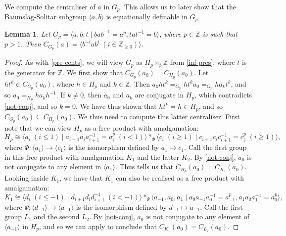 \documentclass[11pt]{amsart}
\newtheorem{lem}[theorem]{Lemma}
\theoremstyle{definition}
\numberwithin{theorem}{section}
\newcommand{\Z}{\mathbb{Z}}
\begin{document}
We compute the centraliser of \(a\) in \(G_p\). This allows us to later show that
	 the Baumslag-Solitar subgroup \(\langle a, b \rangle\) is equationally definable
	 in \(G_p\).
\begin{lem}
		\label{cents}
		Let \(G_p = \langle a, b, t \mid bab^{-1} = a^p, tat^{-1} = b\rangle\),
		where \(p \in \Z\) is such that \(p > 1\).  Then \(C_{G_p}(a) = \langle
		b^{-i} a b^i \; (i  \in \Z_{\geq 0}) \rangle\).
\end{lem}

\begin{proof}
		As with \cref{pre-cents}, we will view \(G_p\) as \(H_p \rtimes_\phi \Z\) from
	\cref{inf-pres}, where \(t\) is the generator for \(\Z\).  We first
	show that \(C_{G_p}(a_0) = C_{H_p}(a_0)\). Let \(h t^k \in C_{G_p}(a_0)\),
	where \(h \in H_p\) and \(k \in \Z\). Then \(a_0 h t^k =_{G_p} ht^k a_0
	=_{G_p} h a_k t^k\), and so \(a_0 =_{H_p} h a_k h^{-1}\). If \(k \neq 0\),
	then \(a_0\) and \(a_k\) are conjugate in \(H_p\), which contradicts
	\cref{not-conj}, and so \(k = 0\).  We have thus shown that \(ht^k = h \in
	H_p\), and so \(C_{G_p}(a_0) \subseteq C_{H_p}(a_0)\). We thus need to
	compute this latter centraliser. First note that we can view \(H_p\) as a
	free product with amalgamation:
	\[
		H_p \cong \langle a_i \; (i \leq 1) \mid a_{i + 1} a_i a_{i + 1}^{-1} = a_i^p 
		\; (i < 1) \rangle \ast_{\Phi} 
		\langle c_i \; (i \geq 1) \mid c_{i + 1} c_i c_{i + 1}^{-1} = c_i^p
		\; (i \geq 1) \rangle,
	\]
	where \(\Phi \colon \langle a_1 \rangle \to \langle c_1 \rangle\) is the
	isomorphism defined by \(a_1 \mapsto c_1\). Call the first group in this
	free product with amalgamation \(K_1\) and the latter \(K_2\).  By
	\cref{not-conj}, \(a_0\) is not conjugate to any element in \(\langle a_1
	\rangle\). Thus \cite[Proposition 2.3]{BarkThesis} tells us that
	\(C_{H_p}(a_0) = C_{K_1}(a_0)\).  Looking inside \(K_1\), we have that
	\(K_1\) can also be realised as a free product with amalgamation:
	\[
		K_1 \cong 
		\langle d_i \; (i \leq -1) \mid d_{i + 1} d_i d_{i + 1}^{-1} 
		\; (i <  -1) \rangle \ast_{\Psi} \langle a_{-1}, a_0, a_1 \mid
		a_0 a_{-1} a_0^{-1} = a_{-1}^p, a_1 a_0 a_1^{-1} = a_0^p \rangle,
	\]
	where \(\Psi \colon \langle d_{-1} \rangle \to \langle a_{-1} \rangle\) is
	the isomorphism defined by \(d_{-1} \mapsto a_{-1}\).  Call the first group
	\(L_1\) and the second \(L_2\). By \cref{not-conj}, \(a_0\) is not
	conjugate to any element of \(\langle a_{-1} \rangle \) in \(H_p\), and so
	we can apply \cite[Proposition 2.3]{BarkThesis} to conclude that
	\(C_{K_1}(a_0) = C_{L_2}(a_0)\). 


\end{proof}
\end{document}
